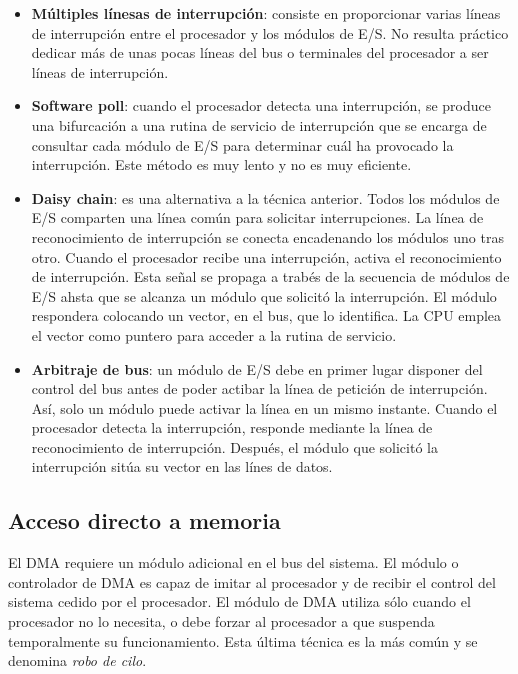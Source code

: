 \begin{subs}
  \begin{itemize}
    \item \textbf{Múltiples línesas de interrupción}: consiste en proporcionar varias líneas de interrupción entre el procesador y los módulos de E/S. No resulta práctico dedicar más de unas pocas líneas del bus o terminales del procesador a ser líneas de interrupción.
    \item \textbf{Software poll}: cuando el procesador detecta una interrupción, se produce una bifurcación a una rutina de servicio de interrupción que se encarga de consultar cada módulo de E/S para determinar cuál ha provocado la interrupción. Este método es muy lento y no es muy eficiente.
    \item \textbf{Daisy chain}: es una alternativa a la técnica anterior. Todos los módulos de E/S comparten una línea común para solicitar interrupciones. La línea de reconocimiento de interrupción se conecta encadenando los módulos uno tras otro. Cuando el procesador recibe una interrupción, activa el reconocimiento de interrupción. Esta señal se propaga a trabés de la secuencia de módulos de E/S ahsta que se alcanza un módulo que solicitó la interrupción. El módulo respondera colocando un vector, en el bus, que lo identifica. La CPU emplea el vector como puntero para acceder a la rutina de servicio.
    \item \textbf{Arbitraje de bus}: un módulo de E/S debe en primer lugar disponer del control del bus antes de poder actibar la línea de petición de interrupción. Así, solo un módulo puede activar la línea en un mismo instante. Cuando el procesador detecta la interrupción, responde mediante la línea de reconocimiento de interrupción. Después, el módulo que solicitó la interrupción sitúa su vector en las línes de datos.
  \end{itemize}
\end{subs}

\subsection{Acceso directo a memoria}

El DMA requiere un módulo adicional en el bus del sistema. El módulo o controlador de DMA es capaz de imitar al procesador y de recibir el control del sistema cedido por el procesador. El módulo de DMA utiliza sólo cuando el procesador no lo necesita, o debe forzar al procesador a que suspenda temporalmente su funcionamiento. Esta última técnica es la más común y se denomina \textit{robo de cilo}.

